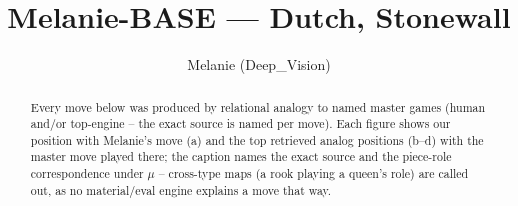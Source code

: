 \documentclass[11pt]{article}
\title{Melanie-BASE — Dutch, Stonewall}
\author{Melanie (Deep\_Vision)}
\date{}
\begin{document}
\maketitle

\begin{abstract}Every move below was produced by relational analogy to named master games (human and/or top-engine -- the exact source is named per move). Each figure shows our position with Melanie's move (a) and the top retrieved analog positions (b--d) with the master move played there; the caption names the exact source and the piece-role correspondence under $\mu$ -- cross-type maps (a rook playing a queen's role) are called out, as no material/eval engine explains a move that way.\end{abstract}

\begin{figure}[p]\centering
\begin{subfigure}{0.46\textwidth}\centering
\resizebox{\linewidth}{!}{%
\newchessgame
\chessboard[
  setfen={rnbqk2r/pp4pp/2pbpn2/3P1p2/3P4/5NP1/PP2PPBP/RNBQ1RK1 b kq - 0 7},
  showmover=false,
  pgfstyle=straightmove, color=movearrow, markmove={e6-d5}
]}
\caption{}
\end{subfigure}\hfill
\begin{subfigure}{0.46\textwidth}\centering
\resizebox{\linewidth}{!}{%
\newchessgame
\chessboard[
  setfen={rnbq1rk1/pp3pbp/3p1np1/2pp4/2P1P3/2N1BP2/PP1Q2PP/R3KBNR w KQ - 0 9},
  showmover=false,
  pgfstyle=straightmove, color=movearrow, markmove={c4-d5}
]}
\caption{}
\end{subfigure}
\\[4pt]
\begin{subfigure}{0.46\textwidth}\centering
\resizebox{\linewidth}{!}{%
\newchessgame
\chessboard[
  setfen={rnbq1rk1/pp3pbp/3p1np1/2pp4/2P1P3/2N1BP2/PP1Q2PP/R3KBNR w KQ - 0 9},
  showmover=false,
  pgfstyle=straightmove, color=movearrow, markmove={c4-d5}
]}
\caption{}
\end{subfigure}\hfill
\begin{subfigure}{0.46\textwidth}\centering
\resizebox{\linewidth}{!}{%
\newchessgame
\chessboard[
  setfen={rnbq1rk1/pp3pbp/3p1np1/2pp4/2P1P3/2N1BP2/PP4PP/RN1QKB1R w KQ - 0 9},
  showmover=false,
  pgfstyle=straightmove, color=movearrow, markmove={c4-d5}
]}
\caption{}
\end{subfigure}

\end{figure}
\end{document}

